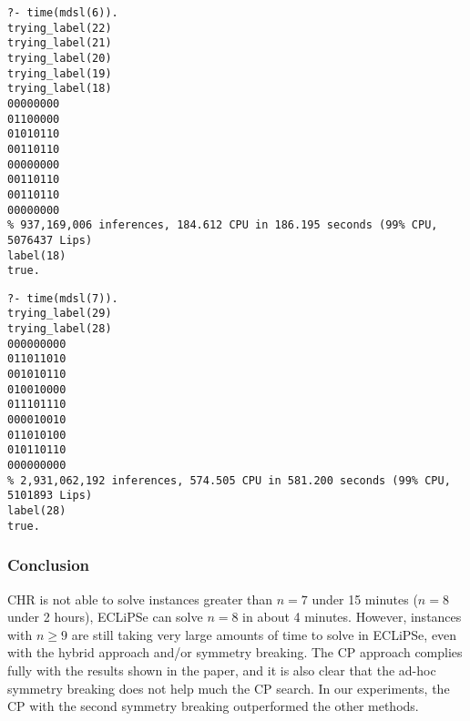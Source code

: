 \begin{verbatim}
?- time(mdsl(6)).
trying_label(22)
trying_label(21)
trying_label(20)
trying_label(19)
trying_label(18)
00000000
01100000
01010110
00110110
00000000
00110110
00110110
00000000
% 937,169,006 inferences, 184.612 CPU in 186.195 seconds (99% CPU, 5076437 Lips)
label(18)
true.
\end{verbatim}

\begin{verbatim}
?- time(mdsl(7)).
trying_label(29)
trying_label(28)
000000000
011011010
001010110
010010000
011101110
000010010
011010100
010110110
000000000
% 2,931,062,192 inferences, 574.505 CPU in 581.200 seconds (99% CPU, 5101893 Lips)
label(28)
true.
\end{verbatim}


\subsubsection{Conclusion}
 CHR is not able to solve instances greater than $n=7$ under 15 minutes ($n=8$ under 2 hours), ECLiPSe can solve $n=8$ in about 4 minutes. However, instances with $n\geq 9$ are still taking very large amounts of time to solve in ECLiPSe, even with the hybrid approach and/or symmetry breaking. The CP approach complies fully with the results shown in the paper, and it is also clear that the ad-hoc symmetry breaking does not help much the CP search. In our experiments, the CP with the second symmetry breaking outperformed the other methods.






